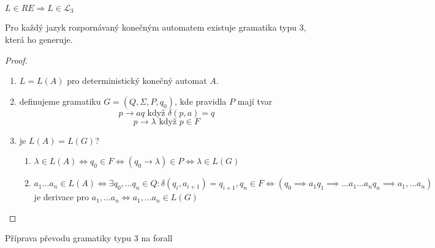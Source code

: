 \documentclass[../main.tex]{subfiles}
\begin{document}
\begin{theorem}
    $L\in RE \Rightarrow L \in \mathcal{L}_3$

    Pro každý jazyk rozpornávaný konečným automatem existuje gramatika typu 3, která ho generuje.

    \begin{proof}
        \begin{enumerate}
            \item $L = L(A)$ pro deterministický konečný automat $A$.
            \item definujeme gramatiku $G=(Q, \Sigma, P, q_0)$, kde pravidla $P$ mají tvar
            \[p \rightarrow aq \text{ když } \delta(p,a) = q\]
            \[p \rightarrow \lambda \text{ když } p \in F\]
            \item je $L(A) = L(G)$?
            \begin{enumerate}
                \item $\lambda \in L(A) \Leftrightarrow q_0 \in F \Leftrightarrow (q_0 \rightarrow \lambda) \in P
                \Leftrightarrow \lambda \in L(G)$
                \item $a_1 \dots a_n \in L(A) \Leftrightarrow \exists q_0,\dots q_n \in Q : \delta(q_i, a_{i+1}) = q_{i+1},q_n \in F
                \Leftrightarrow (q_0 \implies a_1q_1\implies \dots a_1 \dots a_nq_n \implies a_1,\dots a_n)$ je derivace pro $a_1,\dots a_n
                \Leftrightarrow a_1,\dots a_n \in L(G)$
            \end{enumerate}
        \end{enumerate}
    \end{proof}
\end{theorem}

Příprava převodu gramatiky typu 3 na forall
\end{document}
